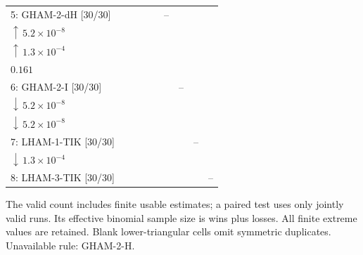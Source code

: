 \begin{table}[!htbp]
{\begin{tabular}{@{}l*{8}{c}@{}}
5: GHAM-2-dH [30/30] &  &  &  &  & -- & \shortstack{$30{:}0{:}0$\\$\uparrow\,5.2\!\times\!10^{-8}$} & \shortstack{$27{:}3{:}0$\\$\uparrow\,1.3\!\times\!10^{-4}$} & \shortstack{$22{:}8{:}0$\\$0.161$} \\
6: GHAM-2-I [30/30] &  &  &  &  &  & -- & \shortstack{$0{:}30{:}0$\\$\downarrow\,5.2\!\times\!10^{-8}$} & \shortstack{$0{:}30{:}0$\\$\downarrow\,5.2\!\times\!10^{-8}$} \\
7: LHAM-1-TIK [30/30] &  &  &  &  &  &  & -- & \shortstack{$3{:}27{:}0$\\$\downarrow\,1.3\!\times\!10^{-4}$} \\
8: LHAM-3-TIK [30/30] &  &  &  &  &  &  &  & -- \\
\bottomrule
\end{tabular}%
}
\endgroup
\par\smallskip
\begin{minipage}{\linewidth}\footnotesize
The valid count includes finite usable estimates; a paired test uses only jointly valid runs. Its effective binomial sample size is wins plus losses. All finite extreme values are retained. Blank lower-triangular cells omit symmetric duplicates.
Unavailable rule: GHAM-2-H.
\end{minipage}
\end{table}
